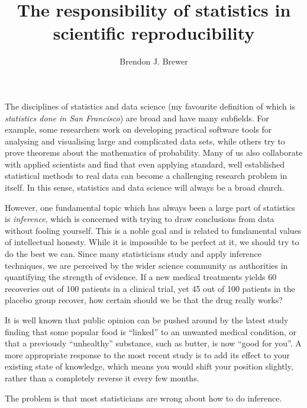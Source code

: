 \documentclass[a4paper, 11pt]{article}
\title{The responsibility of statistics in scientific reproducibility}
\author{Brendon J. Brewer}
\begin{document}
\maketitle

The disciplines of statistics and data science
(my favourite definition of which is {\it statistics done in San Francisco})
are broad and have many subfields. For example, some researchers
work on developing practical software tools for analysing and visualising large and
complicated data sets, while others try to prove theorems about the mathematics
of probability. Many of us also collaborate with applied scientists and find
that even applying standard, well established statistical methods to
real data can become a challenging research problem in itself. In this sense,
statistics and data science will always be a broad church.

However, one fundamental topic which has always been a large part of
statistics is {\it inference}, which is concerned with trying to
draw conclusions from data without fooling yourself. This is a noble goal
and is related to fundamental values of intellectual honesty. While
it is impossible to be perfect at it, we should try to do the best
we can. Since many statisticians study and apply inference techniques,
we are perceived by the wider science community as authorities
in quantifying the strength of evidence. If a new medical treatments yields 60
recoveries out of 100 patients in a clinical trial, yet 45 out of 100 patients
in the placebo group recover, how certain should we be that the drug really works?


It is well known that public opinion can be pushed around by the latest study
finding that some popular food is ``linked'' to an unwanted medical condition,
or that a previously ``unhealthy'' substance, such as butter, is now
``good for you''. A more appropriate response to the most recent study is
to add its effect to your existing state of knowledge,
which means you would shift your position slightly,
rather than a completely reverse it every few months.


The problem is that most statisticians are wrong about how to do inference.
\end{document}
